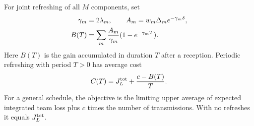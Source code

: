 \documentclass[letterpaper,10pt,conference]{ieeeconf}
\begin{document}
For joint refreshing of all $M$ components, set
\begin{align}
 \gamma_m&=2\lambda_m,\qquad A_m=w_m\Delta_m e^{-\gamma_m\delta},\notag\\
 B(T)&=\sum_m\frac{A_m}{\gamma_m}(1-e^{-\gamma_mT}).\label{eq:refreshdefs}
\end{align}
Here $B(T)$ is the gain accumulated in duration $T$ after a reception. Periodic refreshing with period $T>0$ has average cost
\begin{equation}
 C(T)=J_L^{\rm tot}+\frac{c-B(T)}{T}.\label{eq:periodcost}
\end{equation}
For a general schedule, the objective is the limiting upper average of expected integrated team loss plus $c$ times the number of transmissions. With no refreshes it equals $J_L^{\rm tot}$.
\end{document}
